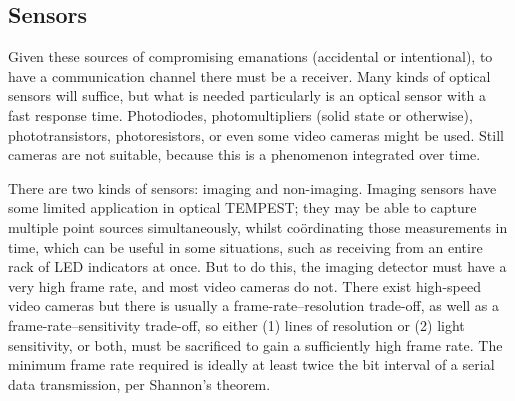 \documentclass[a4paper,twoside,11pt,openany]{book}
\begin{document}
\subsection{Sensors}
Given these sources of compromising emanations (accidental or intentional), to
have a communication channel there must be a receiver. Many kinds of optical
sensors will suffice, but what is needed particularly is an optical sensor with
a fast response time. Photodiodes, photomultipliers (solid state or otherwise),
phototransistors, photoresistors, or even some video cameras might be used.
Still cameras are not suitable, because this is a phenomenon integrated over
time.

There are two kinds of sensors: imaging and non-imaging. Imaging sensors have
some limited application in optical TEMPEST; they may be able to capture
multiple point
sources simultaneously, whilst co\"{o}rdinating those measurements in time,
which
can be useful in some situations, such as receiving from an entire rack of LED
indicators at once. But to do this, the imaging detector must have a very high
frame rate, and most video cameras do not. There exist high-speed video cameras
but there is usually a frame-rate--resolution trade-off, as well as a
frame-rate--sensitivity trade-off, so either (1) lines of resolution or (2)
light sensitivity, or both, must be sacrificed to gain a sufficiently high
frame rate. The minimum frame rate required is ideally at least twice the bit
interval of a serial data transmission, per Shannon's theorem.
\end{document}
